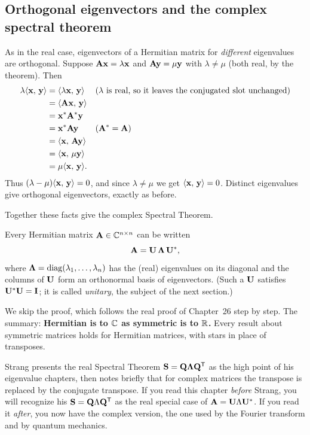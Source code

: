 \subsection{Orthogonal eigenvectors and the complex spectral theorem}

As in the real case, eigenvectors of a Hermitian matrix for \emph{different}
eigenvalues are orthogonal. Suppose $\mathbf{A}\mathbf{x} =
\lambda\mathbf{x}$ and $\mathbf{A}\mathbf{y} = \mu\mathbf{y}$ with $\lambda\ne\mu$ (both real, by
the theorem). Then
\begin{align*}
  \lambda\langle \mathbf{x},\, \mathbf{y} \rangle
  &= \langle \lambda\mathbf{x},\, \mathbf{y} \rangle && \text{($\lambda$ is real, so it leaves the conjugated slot unchanged)}\\
  &= \langle \mathbf{A}\mathbf{x},\, \mathbf{y} \rangle \\
  &= \mathbf{x}^{*}\mathbf{A}^{*}\mathbf{y} \\
  &= \mathbf{x}^{*}\mathbf{A}\mathbf{y} && \text{($\mathbf{A}^{*}=\mathbf{A}$)}\\
  &= \langle \mathbf{x},\, \mathbf{A}\mathbf{y} \rangle \\
  &= \langle \mathbf{x},\, \mu\mathbf{y} \rangle \\
  &= \mu\langle \mathbf{x},\, \mathbf{y} \rangle.
\end{align*}
Thus $(\lambda-\mu)\langle \mathbf{x},\, \mathbf{y} \rangle=0$,
and since $\lambda\ne\mu$ we get $\langle \mathbf{x},\, \mathbf{y} \rangle=0$. Distinct eigenvalues
give orthogonal eigenvectors, exactly as before.

Together these facts give the complex Spectral Theorem.

\begin{theorem}\label{ch32:spectral}
Every Hermitian matrix $\mathbf{A}\in\mathbb{C}^{n\times n}$ can be written
\[
  \mathbf{A} = \mathbf{U}\,\mathbf{\Lambda}\,\mathbf{U}^{*},
\]
where $\mathbf{\Lambda} = \operatorname{diag}(\lambda_1,\dots,\lambda_n)$ has the (real) eigenvalues
on its diagonal and the columns of $\mathbf{U}$ form an orthonormal basis of
eigenvectors. (Such a $\mathbf{U}$ satisfies $\mathbf{U}^{*}\mathbf{U}=\mathbf{I}$; it is called
\emph{unitary}, the subject of the next section.)
\end{theorem}

We skip the proof, which follows the real proof of Chapter~26 step by step.
The summary: \textbf{Hermitian is to $\mathbb{C}$ as symmetric is to $\mathbb{R}$.} Every
result about symmetric matrices holds for Hermitian matrices, with stars in place
of transposes.

\begin{strangbox}
Strang presents the real Spectral Theorem $\mathbf{S}=\mathbf{Q}\mathbf{\Lambda}\mathbf{Q}^{\mathsf{T}}$ as the
high point of his eigenvalue chapters, then notes briefly that for complex
matrices the transpose is replaced by the conjugate transpose. If you read this
chapter \emph{before} Strang, you will recognize his $\mathbf{S}=\mathbf{Q}\Lambda\mathbf{Q}^{\mathsf{T}}$
as the real special case of $\mathbf{A}=\mathbf{U}\Lambda\mathbf{U}^{*}$. If you read it
\emph{after}, you now have the complex version, the one used by the Fourier
transform and by quantum mechanics.
\end{strangbox}

